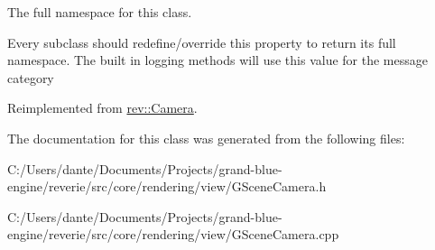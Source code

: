The full namespace for this class. 

Every subclass should redefine/override this property to return its full namespace. The built in logging methods will use this value for the message category 

Reimplemented from \mbox{\hyperlink{classrev_1_1_camera_afd16ba4c2ca04aa0a4945c9aca16606d}{rev\+::\+Camera}}.



The documentation for this class was generated from the following files\+:\begin{DoxyCompactItemize}
\item 
C\+:/\+Users/dante/\+Documents/\+Projects/grand-\/blue-\/engine/reverie/src/core/rendering/view/G\+Scene\+Camera.\+h\item 
C\+:/\+Users/dante/\+Documents/\+Projects/grand-\/blue-\/engine/reverie/src/core/rendering/view/G\+Scene\+Camera.\+cpp\end{DoxyCompactItemize}
